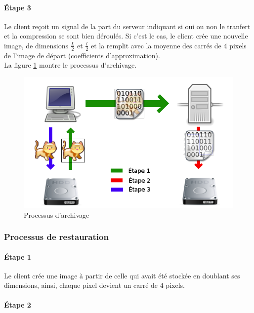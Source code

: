 \documentclass{article}
\begin{document}
\paragraph{Étape 3}

Le client reçoit un signal de la part du serveur indiquant si oui ou non le tranfert et la compression se sont bien déroulés. Si c'est le cas, le client crée une nouvelle image, de dimensions $\frac{L}{2}$ et $\frac{l}{2}$ et la remplit avec la moyenne des carrés de 4 pixels de l'image de départ (coefficients d'approximation). \\


La figure \ref{save} montre le processus d'archivage.

\begin{figure}[!h]
\centering
\includegraphics[scale=0.5]{save.png}
\caption{Processus d'archivage}
\label{save}
\end{figure}


\subsubsection{Processus de restauration}

\paragraph{Étape 1}

Le client crée une image à partir de celle qui avait été stockée en doublant ses dimensions, ainsi, chaque pixel devient un carré de 4 pixels.

\paragraph{Étape 2}
\end{document}
